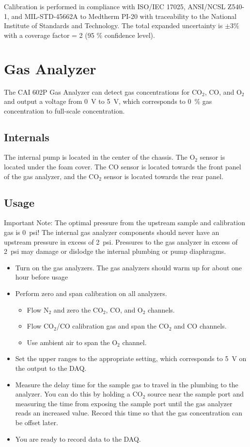 \documentclass[11pt,oneside]{book}
\begin{document}
Calibration is performed in compliance with ISO/IEC 17025, ANSI/NCSL Z540-1, and MIL-STD-45662A to Medtherm PI-20 with traceability to the National Institute of Standards and Technology. The total expanded uncertainty is $\pm 3\%$ with a coverage factor = 2 (95 $\%$ confidence level).


\chapter{Gas Analyzer}
\label{chap:Gas_Analyzer}

The CAI 602P Gas Analyzer can detect gas concentrations for CO$_2$, CO, and O$_2$ and output a voltage from 0~V to 5~V, which corresponds to 0~\% gas concentration to full-scale concentration.

\section{Internals}

The internal pump is located in the center of the chassis. The O$_2$ sensor is located under the foam cover. The CO sensor is located towards the front panel of the gas analyzer, and the CO$_2$ sensor is located towards the rear panel.

\section{Usage}

Important Note: The optimal pressure from the upstream sample and calibration gas is 0~psi! The internal gas analyzer components should never have an upstream pressure in excess of 2~psi. Pressures to the gas analyzer in excess of 2~psi may damage or dislodge the internal plumbing or pump diaphragms.

\begin{itemize}
\item Turn on the gas analyzers. The gas analyzers should warm up for about one hour before usage
\item Perform zero and span calibration on all analyzers.
    \begin{itemize}
    \item Flow N$_2$ and zero the CO$_2$, CO, and O$_2$ channels.
    \item Flow CO$_2$/CO calibration gas and span the CO$_2$ and CO channels.
    \item Use ambient air to span the O$_2$ channel.
    \end{itemize}
\item Set the upper ranges to the appropriate setting, which corresponds to 5~V on the output to the DAQ.
\item Measure the delay time for the sample gas to travel in the plumbing to the analyzer. You can do this by holding a CO$_2$ source near the sample port and measuring the time from exposing the sample port until the gas analyzer reads an increased value. Record this time so that the gas concentration can be offset later.
\item You are ready to record data to the DAQ.
\end{itemize}
\end{document}
